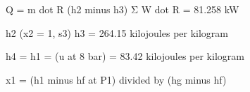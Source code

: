 Q = m dot R (h2 minus h3)  
Σ W dot R = 81.258 kW  

h2 (x2 = 1, s3)  
h3 = 264.15 kilojoules per kilogram  

h4 = h1 = (u at 8 bar) = 83.42 kilojoules per kilogram  

x1 = (h1 minus hf at P1) divided by (hg minus hf)